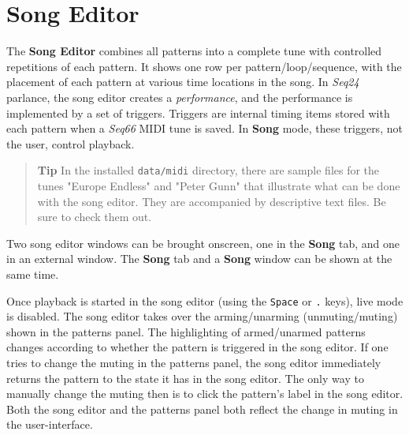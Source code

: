 %
%
%

\section{Song Editor}
\label{sec:song_editor}

   The \textbf{Song Editor} combines all patterns
   into a complete tune with controlled repetitions of each pattern.
   It shows one row per pattern/loop/sequence,
   with the placement of each pattern at various time locations in the song.
   In \textsl{Seq24} parlance, the song editor creates a
   \textsl{performance}, and the performance is implemented by a set of
   triggers.
   Triggers are internal timing items stored with each pattern when a
   \textsl{Seq66} MIDI tune is saved.
   In \textbf{Song} mode, these triggers, not the user, control
   playback.

   \begin{quotation}
      \textbf{Tip}
      In the installed \texttt{data/midi} directory, there are sample files for
      the tunes "Europe Endless" and "Peter Gunn" that illustrate what can be
      done with the song editor.  They are accompanied by descriptive text
      files.  Be sure to check them out.
   \end{quotation}

   Two song editor windows can be
   brought onscreen, one in the \textbf{Song} tab, and
   one in an external window.
   The \textbf{Song} tab and a \textbf{Song} window can be shown at the
   same time.


   Once playback is started in the song editor (using the \texttt{Space} or
   \texttt{.} keys), live mode is disabled.
   The song editor takes over the arming/unarming (unmuting/muting)
   shown in the patterns panel.  The highlighting of armed/unarmed patterns
   changes according to whether the pattern is triggered in the song editor.
   If one tries to change the muting in
   the patterns panel, the song editor immediately returns the pattern to the
   state it has in the song editor.  The only way to manually change the muting
   then is to click the pattern's label in the song editor.
   Both the song editor and the patterns panel both reflect the change in
   muting in the user-interface.

